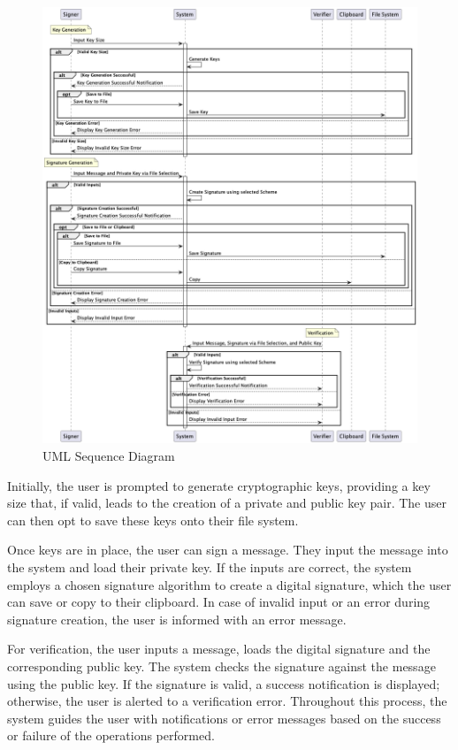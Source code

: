 \documentclass[]{final_report}
\theoremstyle{definition}
\begin{document}
\begin{figure}[H]
    \centering
    \includegraphics[scale=0.48]{sequence.png}
    \caption{UML Sequence Diagram}
    \label{fig:uc}
\end{figure}
Initially, the user is prompted to generate cryptographic keys, providing a key size that, if valid, leads to the creation of a private and public key pair. The user can then opt to save these keys onto their file system.

Once keys are in place, the user can sign a message. They input the message into the system and load their private key. If the inputs are correct, the system employs a chosen signature algorithm to create a digital signature, which the user can save or copy to their clipboard. In case of invalid input or an error during signature creation, the user is informed with an error message.

For verification, the user inputs a message, loads the digital signature and the corresponding public key. The system checks the signature against the message using the public key. If the signature is valid, a success notification is displayed; otherwise, the user is alerted to a verification error. Throughout this process, the system guides the user with notifications or error messages based on the success or failure of the operations performed.


\newpage

\printbibliography
\label{endpage}
\end{document}
